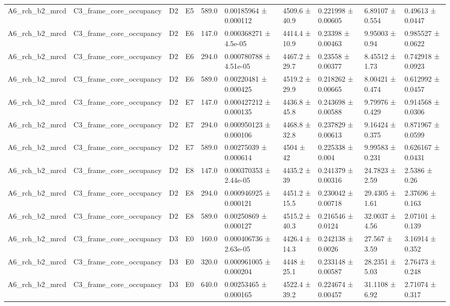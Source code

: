 \begin{table}
\begin{tabular}{llllllllll}
A6\_rch\_b2\_mrcd & C3\_frame\_core\_occupancy & D2 & E5 & 589.0 & 0.00185964 ± 0.000112 & 4509.6 ± 40.9 & 0.221998 ± 0.00605 & 6.89107 ± 0.554 & 0.49613 ± 0.0447 \\
A6\_rch\_b2\_mrcd & C3\_frame\_core\_occupancy & D2 & E6 & 147.0 & 0.000368271 ± 4.5e-05 & 4414.4 ± 10.9 & 0.23398 ± 0.00463 & 9.95003 ± 0.94 & 0.985527 ± 0.0622 \\
A6\_rch\_b2\_mrcd & C3\_frame\_core\_occupancy & D2 & E6 & 294.0 & 0.000780788 ± 4.51e-05 & 4467.2 ± 29.7 & 0.23558 ± 0.00377 & 8.45512 ± 1.73 & 0.742918 ± 0.0923 \\
A6\_rch\_b2\_mrcd & C3\_frame\_core\_occupancy & D2 & E6 & 589.0 & 0.00220481 ± 0.000425 & 4519.2 ± 29.9 & 0.218262 ± 0.00665 & 8.00421 ± 0.474 & 0.612992 ± 0.0457 \\
A6\_rch\_b2\_mrcd & C3\_frame\_core\_occupancy & D2 & E7 & 147.0 & 0.000427212 ± 0.000135 & 4436.8 ± 45.8 & 0.243698 ± 0.00588 & 9.79976 ± 0.429 & 0.914568 ± 0.0306 \\
A6\_rch\_b2\_mrcd & C3\_frame\_core\_occupancy & D2 & E7 & 294.0 & 0.000950123 ± 0.000106 & 4468.8 ± 32.8 & 0.237829 ± 0.00613 & 9.16424 ± 0.375 & 0.871967 ± 0.0599 \\
A6\_rch\_b2\_mrcd & C3\_frame\_core\_occupancy & D2 & E7 & 589.0 & 0.00275039 ± 0.000614 & 4504 ± 42 & 0.225338 ± 0.004 & 9.99583 ± 0.231 & 0.626167 ± 0.0431 \\
A6\_rch\_b2\_mrcd & C3\_frame\_core\_occupancy & D2 & E8 & 147.0 & 0.000370353 ± 2.44e-05 & 4435.2 ± 39 & 0.241379 ± 0.00316 & 24.7823 ± 2.59 & 2.5386 ± 0.26 \\
A6\_rch\_b2\_mrcd & C3\_frame\_core\_occupancy & D2 & E8 & 294.0 & 0.000946925 ± 0.000121 & 4451.2 ± 15.5 & 0.230042 ± 0.00718 & 29.4305 ± 1.61 & 2.37696 ± 0.163 \\
A6\_rch\_b2\_mrcd & C3\_frame\_core\_occupancy & D2 & E8 & 589.0 & 0.00250869 ± 0.000127 & 4515.2 ± 40.3 & 0.216546 ± 0.0124 & 32.0037 ± 4.56 & 2.07101 ± 0.139 \\
A6\_rch\_b2\_mrcd & C3\_frame\_core\_occupancy & D3 & E0 & 160.0 & 0.000406736 ± 2.63e-05 & 4426.4 ± 14.3 & 0.242138 ± 0.0026 & 27.567 ± 3.59 & 3.16914 ± 0.352 \\
A6\_rch\_b2\_mrcd & C3\_frame\_core\_occupancy & D3 & E0 & 320.0 & 0.000961005 ± 0.000204 & 4448 ± 25.1 & 0.233148 ± 0.00587 & 28.2351 ± 5.03 & 2.76473 ± 0.248 \\
A6\_rch\_b2\_mrcd & C3\_frame\_core\_occupancy & D3 & E0 & 640.0 & 0.00253465 ± 0.000165 & 4522.4 ± 39.2 & 0.224674 ± 0.00457 & 31.1108 ± 6.92 & 2.71074 ± 0.317 \\

\end{tabular}
\end{table}
